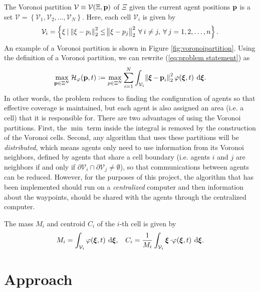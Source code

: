 \documentclass{article}
\DeclareMathOperator{\bxi}{\boldsymbol{\xi}}
\begin{document}
The Voronoi partition $\mathcal{V} \equiv \mathcal{V}(\Xi, \operatorname{\mathbf{p}})$ of $\Xi$ given the current agent positions $\operatorname{\mathbf{p}}$ is a set $\mathcal{V} = \left\{ \mathcal{V}_1, \mathcal{V}_2, \dots, \mathcal{V}_N \right\}$. Here, each cell $\mathcal{V}_i$ is given by 
\begin{equation*}
	\displaystyle \mathcal{V}_i = \left\{ \xi \: | \: \norm{\xi - p_i}^2_2 \leq \norm{\xi - p_j}^2_2 \: \forall \: i \neq j, \: \forall \: j = 1, 2, \dots, n \right\}.
\end{equation*}
An example of a Voronoi partition is shown in Figure \ref{fig:voronoipartition}. Using the definition of a Voronoi partition, we can rewrite (\ref{eq:problem statement}) as 
\begin{equation}
	\label{eq:rewritten coverage control}
	\displaystyle \max\limits_{\bp \in \Xi^N}{\mathcal{H}_{\varphi}(\bp, t)} := \max\limits_{p \in \Xi^N}\sum\limits_{i=1}^{N}{\int_{\mathcal{V}_i}{\norm{\bxi - \bp_i}^2_2 \varphi(\bxi, t)\: \dif \bxi}}.
\end{equation}
In other words, the problem reduces to finding the configuration of agents so that effective coverage is maintained, but each agent is also assigned an area (i.e. a cell) that it is responsible for. There are two advantages of using the Voronoi partitions. First, the $\min$ term inside the integral is removed by the construction of the Voronoi cells. Second, any algorithm that uses these partitions will be \textit{distributed}, which means agents only need to use information from its Voronoi neighbors, defined by agents that share a cell boundary (i.e. agents $i$ and $j$ are neighbors if and only if $\partial \mathcal{V}_i \cap \partial \mathcal{V}_j \neq \emptyset$), so that communications between agents can be reduced. However, for the purposes of this project, the algorithm that has been implemented should run on a \textit{centralized} computer and then information about the waypoints, should be shared with the agents through the centralized computer.

The mass $M_i$ and centroid $C_i$ of the $i$-th cell is given by 
\begin{equation}
	\label{eq:mass, center of mass}
	\displaystyle M_i = \int_{\mathcal{V}_i}{\varphi(\bxi, t)\: \dif \bxi}, \:\:\:\: C_i = \frac{1}{M_i}\int_{\mathcal{V}_i}{\bxi \cdot \varphi(\bxi, t) \: \dif \bxi}.
\end{equation}
\section{Approach}
\end{document}
